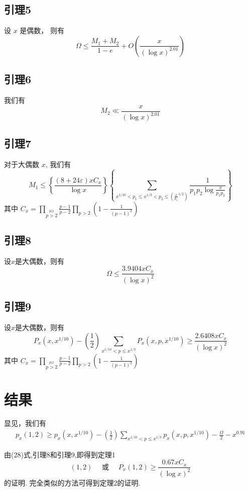 \documentclass{article}
\begin{document}
\subsection{引理5}
设 $x$ 是偶数， 则有 
\[
    \Omega \le \frac{M_1 + M_2}{1-e} + O(\frac{x}{(\log x)^{2.01}})    
\]

\subsection{引理6}
我们有 
\[
    M_2 \ll \frac{x}{(\log x)^{2.01}} 
\]

\subsection{引理7}
对于大偶数 $x$, 我们有
\[
    M_1 \le \left\{\frac{(8+24\varepsilon)xC_x}{\log x}\right\}
        \left\{\sum_{x^{1/10}<p_1\le x^{1/3}<p_2\le (\frac{x}{p_1}^{1/2})}^{}{\frac{1}{p_1p_2\log\frac{x}{p_1p_2}}}\right\}
\]
其中 $\displaystyle C_x = \prod_{\stackrel{p|x}{p>2}}\frac{p-1}{p-2}\prod_{p>2}\left(1-\frac{1}{(p-1)^2}\right)$


\subsection{引理8}
设$x$是大偶数，则有
\[
    \Omega \le \frac{3.9404xC_x}{(\log x)^2}    
\]

\subsection{引理9}
设$x$是大偶数，则有 
\[
    P_x(x, x^{1/10}) - (\frac12) \sum_{x^{1/10}<p\le x^{1/3}}^{}{P_x(x, p, x^{1/10})} 
    \ge \frac{2.6408xC_x}{(\log x)^2}   
\]
其中 $\displaystyle C_x = \prod_{\stackrel{p|x}{p>2}}\frac{p-1}{p-2}\prod_{p>2}\left(1-\frac{1}{(p-1)^2}\right)$



\section{结果}
显见，我们有
\begin{align}
    p_x(1, 2) \ge p_x(x, x^{1/10}) - (\frac12)\sum_{x^{1/10}<p\le x^{1/3}}^{}{p_x(x, p, x^{1/10})} - \frac{\Omega}{2} -x^{0.91}
\end{align}

由(28)式,引理8和引理9,即得到定理1
\[
    (1, 2)\quad \text{ 或 }\quad  P_x(1, 2)\ge \frac{0.67xC_x}{(\log x)^2}   
\]
的证明. 完全类似的方法可得到定理2的证明.
\end{document}
